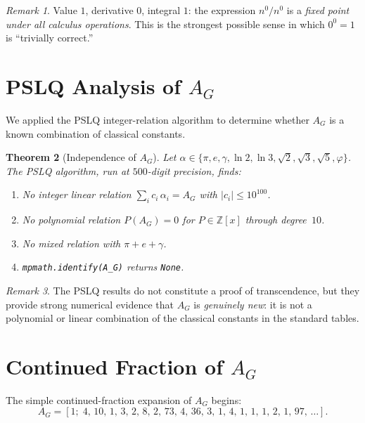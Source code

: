 \documentclass[11pt,a4paper]{article}
\newtheorem{theorem}{Theorem}[section]
\theoremstyle{definition}
\theoremstyle{remark}
\newtheorem{remark}[theorem]{Remark}
\newcommand{\AG}{A_G}
\begin{document}
\begin{remark}
Value $1$, derivative $0$, integral $1$: the expression $n^{0}/n^{0}$ is a \emph{fixed point under all calculus operations}. This is the strongest possible sense in which $0^{0}=1$ is ``trivially correct.''
\end{remark}

\section{PSLQ Analysis of \texorpdfstring{$\AG$}{A\_G}}\label{sec:pslq}

We applied the PSLQ integer-relation algorithm to determine whether $\AG$ is a known combination of classical constants.

\begin{theorem}[Independence of $\AG$]
Let $\alpha \in \{\pi, e, \gamma, \ln 2, \ln 3, \sqrt{2}, \sqrt{3}, \sqrt{5}, \varphi\}$.
The PSLQ algorithm, run at $500$-digit precision, finds:
\begin{enumerate}
  \item No integer linear relation $\sum_{i} c_{i}\,\alpha_{i} = \AG$ with $|c_{i}| \leq 10^{100}$.
  \item No polynomial relation $P(\AG) = 0$ for $P \in \mathbb{Z}[x]$ through degree~$10$.
  \item No mixed relation with $\pi + e + \gamma$.
  \item \texttt{mpmath.identify(\AG)} returns \texttt{None}.
\end{enumerate}
\end{theorem}

\begin{remark}
The PSLQ results do not constitute a proof of transcendence, but they provide strong numerical evidence that $\AG$ is \emph{genuinely new}: it is not a polynomial or linear combination of the classical constants in the standard tables.
\end{remark}

\section{Continued Fraction of \texorpdfstring{$\AG$}{A\_G}}\label{sec:cfrac}

The simple continued-fraction expansion of $\AG$ begins:
\[
  \AG = [1;\; 4,\, 10,\, 1,\, 3,\, 2,\, 8,\, 2,\, 73,\, 4,\, 36,\, 3,\, 1,\, 4,\, 1,\, 1,\, 1,\, 2,\, 1,\, 97,\, \ldots].
\]
\end{document}

